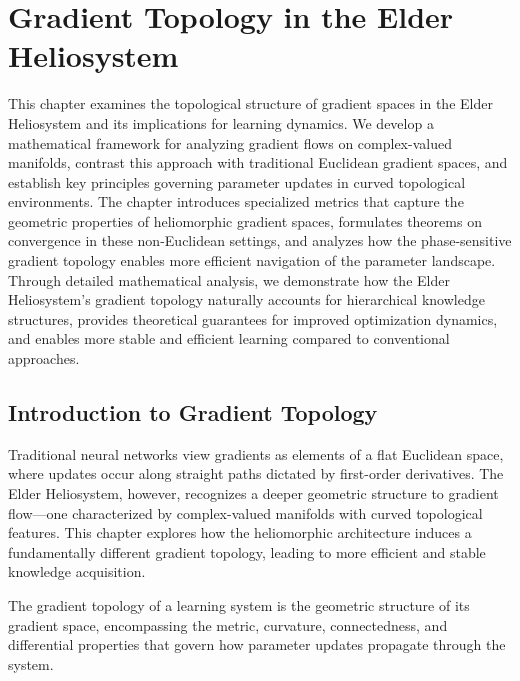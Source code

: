 \chapter{Gradient Topology in the Elder Heliosystem}

\begin{tcolorbox}[colback=blue!5!white,colframe=blue!75!black,title=Chapter Summary]
This chapter examines the topological structure of gradient spaces in the Elder Heliosystem and its implications for learning dynamics. We develop a mathematical framework for analyzing gradient flows on complex-valued manifolds, contrast this approach with traditional Euclidean gradient spaces, and establish key principles governing parameter updates in curved topological environments. The chapter introduces specialized metrics that capture the geometric properties of heliomorphic gradient spaces, formulates theorems on convergence in these non-Euclidean settings, and analyzes how the phase-sensitive gradient topology enables more efficient navigation of the parameter landscape. Through detailed mathematical analysis, we demonstrate how the Elder Heliosystem's gradient topology naturally accounts for hierarchical knowledge structures, provides theoretical guarantees for improved optimization dynamics, and enables more stable and efficient learning compared to conventional approaches.
\end{tcolorbox}

\section{Introduction to Gradient Topology}

Traditional neural networks view gradients as elements of a flat Euclidean space, where updates occur along straight paths dictated by first-order derivatives. The Elder Heliosystem, however, recognizes a deeper geometric structure to gradient flow—one characterized by complex-valued manifolds with curved topological features. This chapter explores how the heliomorphic architecture induces a fundamentally different gradient topology, leading to more efficient and stable knowledge acquisition.

\begin{definition}
The gradient topology of a learning system is the geometric structure of its gradient space, encompassing the metric, curvature, connectedness, and differential properties that govern how parameter updates propagate through the system.
\end{definition}


